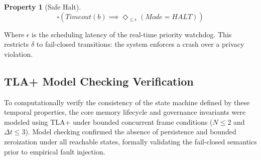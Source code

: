 \documentclass[conference]{IEEEtran}
\newtheorem{property}{Property}
\begin{document}
\begin{property}[Safe Halt]
\begin{equation}
\square \left( Timeout(b) \implies \Diamond_{\le \epsilon} (Mode = HALT) \right)
\end{equation}
\end{property}
Where $\epsilon$ is the scheduling latency of the real-time priority watchdog. This restricts $\delta$ to fail-closed transitions: the system enforces a crash over a privacy violation.

\subsection{TLA+ Model Checking Verification}
To computationally verify the consistency of the state machine defined by these temporal properties, the core memory lifecycle and governance invariants were modeled using TLA+ under bounded concurrent frame conditions ($N \le 2$ and $\Delta t \le 3$). Model checking confirmed the absence of persistence and bounded zeroization under all reachable states, formally validating the fail-closed semantics prior to empirical fault injection.
\end{document}
